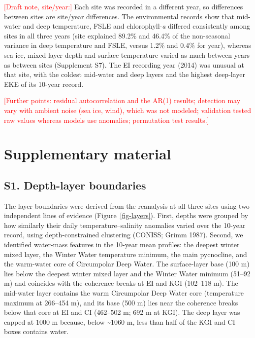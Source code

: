 \documentclass[
  11pt,
]{article}
\newcommand{\ins}[1]{\textcolor{red}{[#1]}}
\begin{document}
\ins{Draft note, site/year:} Each site was recorded in a different year,
so differences between sites are site/year differences. The
environmental records show that mid-water and deep temperature, FSLE and
chlorophyll-\emph{a} differed consistently among sites in all three
years (site explained 89.2\% and 46.4\% of the non-seasonal variance in
deep temperature and FSLE, versus 1.2\% and 0.4\% for year), whereas sea
ice, mixed layer depth and surface temperature varied as much between
years as between sites (Supplement S7). The EI recording year (2014) was
unusual at that site, with the coldest mid-water and deep layers and the
highest deep-layer EKE of its 10-year record.

\ins{Further points: residual autocorrelation and the AR(1) results; detection may vary with ambient noise (sea ice, wind), which was not modeled; validation tested raw values whereas models use anomalies; permutation test results.}

\clearpage

\section*{Supplementary material}\label{supplementary-material}

\setcounter{figure}{0}
\setcounter{table}{0}
\renewcommand{\thefigure}{S\arabic{figure}}
\renewcommand{\thetable}{S\arabic{table}}

\subsection*{S1. Depth-layer
boundaries}\label{s1.-depth-layer-boundaries}

The layer boundaries were derived from the reanalysis at all three sites
using two independent lines of evidence (Figure~\ref{fig-layers}).
First, depths were grouped by how similarly their daily
temperature--salinity anomalies varied over the 10-year record, using
depth-constrained clustering (CONISS; Grimm 1987). Second, we identified
water-mass features in the 10-year mean profiles: the deepest winter
mixed layer, the Winter Water temperature minimum, the main pycnocline,
and the warm-water core of Circumpolar Deep Water. The surface-layer
base (100 m) lies below the deepest winter mixed layer and the Winter
Water minimum (51--92 m) and coincides with the coherence breaks at EI
and KGI (102--118 m). The mid-water layer contains the warm Circumpolar
Deep Water core (temperature maximum at 266--454 m), and its base (500
m) lies near the coherence breaks below that core at EI and CI (462--502
m; 692 m at KGI). The deep layer was capped at 1000 m because, below
\textasciitilde1060 m, less than half of the KGI and CI boxes contains
water.
\end{document}
